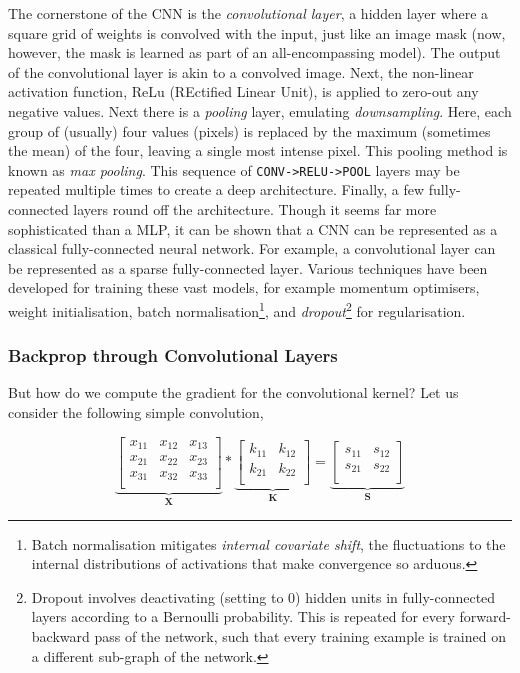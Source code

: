 The cornerstone of the CNN is the \emph{convolutional layer}, a hidden layer where a square grid of weights is convolved with the input, just like an image mask (now, however, the mask is learned as part of an all-encompassing model). The output of the convolutional layer is akin to a convolved image. Next, the non-linear activation function, ReLu (REctified Linear Unit), is applied to zero-out any negative values. Next there is a \emph{pooling} layer, emulating \emph{downsampling}. Here, each group of (usually) four values (pixels) is replaced by the maximum (sometimes the mean) of the four, leaving a single most intense pixel. This pooling method is known as \emph{max pooling}. This sequence of \texttt{CONV->RELU->POOL} layers may be repeated multiple times to create a deep architecture. Finally, a few fully-connected layers round off the architecture. Though it seems far more sophisticated than a MLP, it can be shown that a CNN can be represented as a classical fully-connected neural network. For example, a convolutional layer can be represented as a sparse fully-connected layer. Various techniques have been developed for training these vast models, for example momentum optimisers, weight initialisation, batch normalisation\footnote{Batch normalisation mitigates \emph{internal covariate shift}, the fluctuations to the internal distributions of activations that make convergence so arduous.}, and \emph{dropout}\footnote{Dropout involves deactivating (setting to $0$) hidden units in fully-connected layers according to a Bernoulli probability. This is repeated for every forward-backward pass of the network, such that every training example is trained on a different sub-graph of the network.} for regularisation.

\subsubsection{Backprop through Convolutional Layers}

But how do we compute the gradient for the convolutional kernel? Let us consider the following simple convolution,

$$
\underbrace{\begin{bmatrix}
x_{11} & x_{12} & x_{13} \\
x_{21} & x_{22} & x_{23} \\
x_{31} & x_{32} & x_{33} \\
\end{bmatrix}}_{\mathbf{X}} * 
\underbrace{\begin{bmatrix}
k_{11} & k_{12} \\
k_{21} & k_{22} \\
\end{bmatrix}}_{\mathbf{K}} =
\underbrace{\begin{bmatrix}
s_{11} & s_{12} \\
s_{21} & s_{22} \\
\end{bmatrix}}_{\mathbf{S}}
$$

